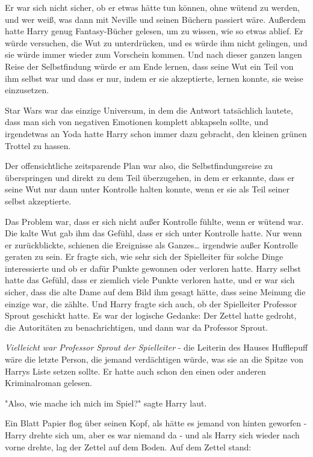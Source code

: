 {Er war sich nicht sicher, ob er etwas hätte tun können, ohne wütend zu werden, und wer weiß, was dann mit Neville und seinen Büchern passiert wäre. Außerdem hatte Harry genug Fantasy-Bücher gelesen, um zu wissen, wie so etwas ablief. Er würde versuchen, die Wut zu unterdrücken, und es würde ihm nicht gelingen, und sie würde immer wieder zum Vorschein kommen. Und nach dieser ganzen langen Reise der Selbstfindung würde er am Ende lernen, dass seine Wut ein Teil von ihm selbst war und dass er nur, indem er sie akzeptierte, lernen konnte, sie weise einzusetzen.

Star Wars war das einzige Universum, in dem die Antwort tatsächlich lautete, dass man sich von negativen Emotionen komplett abkapseln sollte, und irgendetwas an Yoda hatte Harry schon immer dazu gebracht, den kleinen grünen Trottel zu hassen.

Der offensichtliche zeitsparende Plan war also, die Selbstfindungsreise zu überspringen und direkt zu dem Teil überzugehen, in dem er erkannte, dass er seine Wut nur dann unter Kontrolle halten konnte, wenn er sie als Teil seiner selbst akzeptierte.

Das Problem war, dass er sich nicht außer Kontrolle fühlte, wenn er wütend war. Die kalte Wut gab ihm das Gefühl, dass er sich unter Kontrolle hatte. Nur wenn er zurückblickte, schienen die Ereignisse als Ganzes… irgendwie außer Kontrolle geraten zu sein. Er fragte sich, wie sehr sich der Spielleiter für solche Dinge interessierte und ob er dafür Punkte gewonnen oder verloren hatte. Harry selbst hatte das Gefühl, dass er ziemlich viele Punkte verloren hatte, und er war sich sicher, dass die alte Dame auf dem Bild ihm gesagt hätte, dass seine Meinung die einzige war, die zählte. Und Harry fragte sich auch, ob der Spielleiter Professor Sprout geschickt hatte. Es war der logische Gedanke: Der Zettel hatte gedroht, die Autoritäten zu benachrichtigen, und dann war da Professor Sprout.

\emph{Vielleicht war Professor Sprout der Spielleiter} - die Leiterin des Hauses Hufflepuff wäre die letzte Person, die jemand verdächtigen würde, was sie an die Spitze von Harrys Liste setzen sollte. Er hatte auch schon den einen oder anderen Kriminalroman gelesen.

"Also, wie mache ich mich im Spiel?" sagte Harry laut.

Ein Blatt Papier flog über seinen Kopf, als hätte es jemand von hinten geworfen - Harry drehte sich um, aber es war niemand da - und als Harry sich wieder nach vorne drehte, lag der Zettel auf dem Boden. Auf dem Zettel stand:

}
